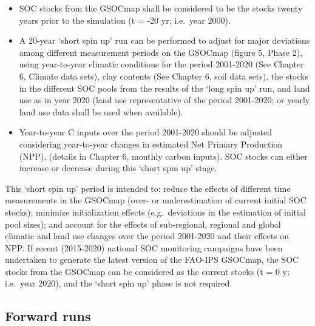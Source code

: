 \documentclass[
  10pt,
  b5paper,
]{book}
\providecommand{\tightlist}{%
  \setlength{\itemsep}{0pt}\setlength{\parskip}{0pt}}
\begin{document}
\begin{itemize}
\tightlist
\item
  SOC stocks from the GSOCmap shall be considered to be the stocks twenty years prior to the simulation (t = -20 yr; i.e.~year 2000).
\item
  A 20-year `short spin up' run can be performed to adjust for major deviations among different measurement periods on the GSOCmap (figure 5, Phase 2), using year-to-year climatic conditions for the period 2001-2020 (See Chapter 6, Climate data sets), clay contents (See Chapter 6, soil data sets), the stocks in the different SOC pools from the results of the `long spin up' run, and land use as in year 2020 (land use representative of the period 2001-2020; or yearly land use data shall be used when available).
\item
  Year-to-year C inputs over the period 2001-2020 should be adjusted considering year-to-year changes in estimated Net Primary Production (NPP), (details in Chapter 6, monthly carbon inputs). SOC stocks can either increase or decrease during this `short spin up' stage.
\end{itemize}

This `short spin up' period is intended to: reduce the effects of different time measurements in the GSOCmap (over- or underestimation of current initial SOC stocks); minimize initialization effects (e.g.~deviations in the estimation of initial pool sizes); and account for the effects of sub-regional, regional and global climatic and land use changes over the period 2001-2020 and their effects on NPP. If recent (2015-2020) national SOC monitoring campaigns have been undertaken to generate the latest version of the FAO-IPS GSOCmap, the SOC stocks from the GSOCmap can be considered as the current stocks (t = 0 y; i.e.~year 2020), and the `short spin up' phase is not required.

\hypertarget{forward-runs}{%
\subsection{Forward runs}\label{forward-runs}}
\end{document}
